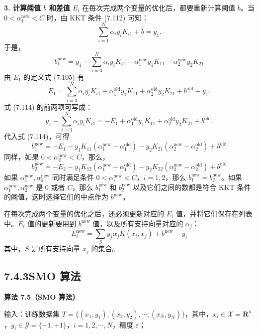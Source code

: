 \documentclass[UTF8, 12pt, fontset=fandol, oneside]{ctexart}
\begin{document}
\noindent\textbf{3. 计算阈值 $b$ 和差值 $E_i$}\quad
在每次完成两个变量的优化后，都要重新计算阈值 $b$。当 $0<\alpha_1^{\mathrm{new}}<C$ 时，由 KKT 条件 (7.112) 可知：
\[
\sum_{i=1}^N\alpha_i y_iK_{i1}+b=y_1.
\]
于是，
\begin{equation}
b_1^{\mathrm{new}}=y_1-\sum_{i=3}^N\alpha_i y_iK_{i1}-\alpha_1^{\mathrm{new}}y_1K_{11}-\alpha_2^{\mathrm{new}}y_2K_{21}
\tag{7.114}
\end{equation}
由 $E_1$ 的定义式 (7.105) 有
\[
E_1=\sum_{i=3}^N\alpha_i y_iK_{i1}+\alpha_1^{\mathrm{old}}y_1K_{11}+\alpha_2^{\mathrm{old}}y_2K_{21}+b^{\mathrm{old}}-y_1.
\]
式 (7.114) 的前两项可写成：
\[
y_1-\sum_{i=3}^N\alpha_i y_iK_{i1}
=-E_1+\alpha_1^{\mathrm{old}}y_1K_{11}+\alpha_2^{\mathrm{old}}y_2K_{21}+b^{\mathrm{old}}.
\]
代入式 (7.114)，可得
\begin{equation}
b_1^{\mathrm{new}}=-E_1-y_1K_{11}(\alpha_1^{\mathrm{new}}-\alpha_1^{\mathrm{old}})
-y_2K_{21}(\alpha_2^{\mathrm{new}}-\alpha_2^{\mathrm{old}})+b^{\mathrm{old}}
\tag{7.115}
\end{equation}
同样，如果 $0<\alpha_2^{\mathrm{new}}<C$，那么，
\begin{equation}
b_2^{\mathrm{new}}=-E_2-y_1K_{12}(\alpha_1^{\mathrm{new}}-\alpha_1^{\mathrm{old}})
-y_2K_{22}(\alpha_2^{\mathrm{new}}-\alpha_2^{\mathrm{old}})+b^{\mathrm{old}}
\tag{7.116}
\end{equation}
如果 $\alpha_1^{\mathrm{new}},\alpha_2^{\mathrm{new}}$ 同时满足条件 $0<\alpha_i^{\mathrm{new}}<C$，$i=1,2$，那么 $b_1^{\mathrm{new}}=b_2^{\mathrm{new}}$。如果 $\alpha_1^{\mathrm{new}},\alpha_2^{\mathrm{new}}$ 是 0 或者 $C$，那么 $b_1^{\mathrm{new}}$ 和 $b_2^{\mathrm{new}}$ 以及它们之间的数都是符合 KKT 条件的阈值，这时选择它们的中点作为 $b^{\mathrm{new}}$。

在每次完成两个变量的优化之后，还必须更新对应的 $E_i$ 值，并将它们保存在列表中。$E_i$ 值的更新要用到 $b^{\mathrm{new}}$ 值，以及所有支持向量对应的 $\alpha_j$：
\begin{equation}
E_i^{\mathrm{new}}=\sum_S y_j\alpha_jK(x_i,x_j)+b^{\mathrm{new}}-y_i
\tag{7.117}
\end{equation}
其中，$S$ 是所有支持向量 $x_j$ 的集合。

\subsection*{7.4.3\quad SMO 算法}

\noindent\textbf{算法 7.5（SMO 算法）}

输入：训练数据集 $T=\{(x_1,y_1),(x_2,y_2),\cdots,(x_N,y_N)\}$，其中，$x_i\in\mathcal{X}=\mathbf{R}^n$，$y_i\in\mathcal{Y}=\{-1,+1\}$，$i=1,2,\cdots,N$，精度 $\varepsilon$；
\end{document}
